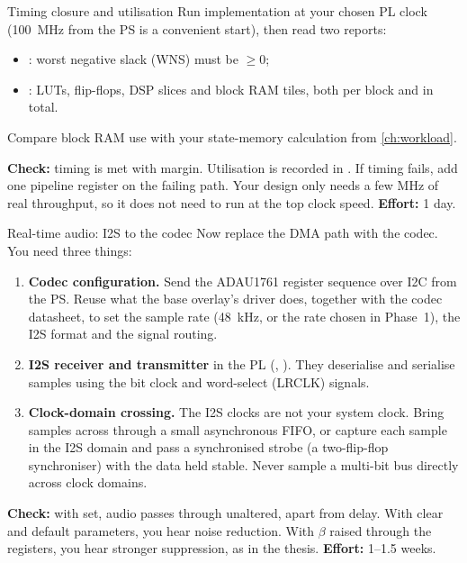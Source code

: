 \begin{stepbox}[label=st:fpga:timing]{Timing closure and utilisation}
Run implementation at your chosen PL clock (\qty{100}{\MHz} from the PS is a
convenient start), then read two reports:
\begin{itemize}
  \item {}: worst negative slack (WNS) must be
        $\ge 0$;
  \item {}: LUTs, flip-flops, DSP slices and block RAM
        tiles, both per block and in total.
\end{itemize}
Compare block RAM use with your state-memory calculation from \cref{ch:workload}.

\textbf{Check:} timing is met with margin. Utilisation is recorded in
. If timing fails, add one pipeline register on the
failing path. Your design only needs a few MHz of real throughput, so it does
not need to run at the top clock speed. \textbf{Effort:} 1 day.
\end{stepbox}

\begin{stepbox}[label=st:fpga:audio]{Real-time audio: I2S to the codec}
Now replace the DMA path with the codec. You need three things:
\begin{enumerate}
  \item \textbf{Codec configuration.} Send the ADAU1761 register sequence over
  I2C from the PS. Reuse what the base overlay's driver does, together with the
  codec datasheet, to set the sample rate (\qty{48}{\kHz}, or the rate chosen in
  Phase~1), the I2S format and the signal routing.
  \item \textbf{I2S receiver and transmitter} in the PL (,
  ). They deserialise and serialise samples using the bit
  clock and word-select (LRCLK) signals.
  \item \textbf{Clock-domain crossing.} The I2S clocks are not your system clock.
  Bring samples across through a small asynchronous FIFO, or capture each
  sample in the I2S domain and pass a synchronised strobe (a two-flip-flop
  synchroniser) with the data held stable. Never sample a multi-bit bus
  directly across clock domains.
\end{enumerate}

\textbf{Check:} with  set, audio passes through unaltered,
apart from delay. With  clear and default parameters, you hear
noise reduction. With $\beta$ raised through the registers, you hear stronger
suppression, as in the thesis. \textbf{Effort:} 1--1.5 weeks.
\end{stepbox}

